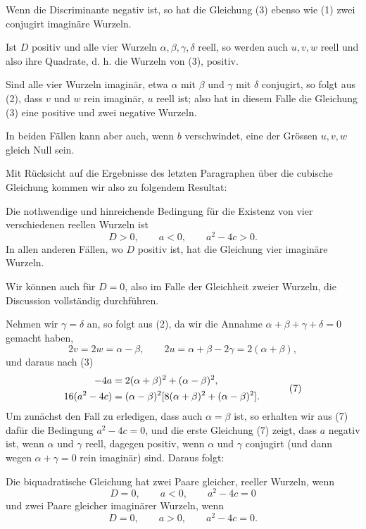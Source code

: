 \documentclass[11pt]{article}
\begin{document}
Wenn die Discriminante negativ ist, so hat die Gleichung (3) ebenso wie (1) zwei conjugirt imagin\"are Wurzeln.

Ist $D$ positiv und alle vier Wurzeln $\alpha,\beta,\gamma,\delta$ reell, so werden auch $u,v,w$ reell und also ihre Quadrate, d. h. die Wurzeln von (3), positiv.

Sind alle vier Wurzeln imagin\"ar, etwa $\alpha$ mit $\beta$ und $\gamma$ mit $\delta$ conjugirt, so folgt aus (2), dass $v$ und $w$ rein imagin\"ar, $u$ reell ist; also hat in diesem Falle die Gleichung (3) eine positive und zwei negative Wurzeln.

In beiden F\"allen kann aber auch, wenn $b$ verschwindet, eine der Gr\"ossen $u,v,w$ gleich Null sein.

Mit R\"ucksicht auf die Ergebnisse des letzten Paragraphen \"uber die cubische Gleichung kommen wir also zu folgendem Resultat:

Die nothwendige und hinreichende Bedingung f\"ur die Existenz von vier verschiedenen reellen Wurzeln ist
\begin{equation}
        D>0,
        \qquad a<0,
        \qquad a^2-4c>0.
\tag{6}
\end{equation}
In allen anderen F\"allen, wo $D$ positiv ist, hat die Gleichung vier imagin\"are Wurzeln.

Wir k\"onnen auch f\"ur $D=0$, also im Falle der Gleichheit zweier Wurzeln, die Discussion vollst\"andig durchf\"uhren.

Nehmen wir $\gamma=\delta$ an, so folgt aus (2), da wir die Annahme $\alpha+\beta+\gamma+\delta=0$ gemacht haben,
\[
        2v=2w=\alpha-\beta,
        \qquad
        2u=\alpha+\beta-2\gamma=2(\alpha+\beta),
\]
und daraus nach (3)
\begin{equation}
\begin{aligned}
        -4a&=2(\alpha+\beta)^2+(\alpha-\beta)^2,\cr
        16(a^2-4c)&=(\alpha-\beta)^2[8(\alpha+\beta)^2+(\alpha-\beta)^2].
\end{aligned}
\tag{7}
\end{equation}
Um zun\"achst den Fall zu erledigen, dass auch $\alpha=\beta$ ist, so erhalten wir aus (7) daf\"ur die Bedingung $a^2-4c=0$, und die erste Gleichung (7) zeigt, dass $a$ negativ ist, wenn $\alpha$ und $\gamma$ reell, dagegen positiv, wenn $\alpha$ und $\gamma$ conjugirt (und dann wegen $\alpha+\gamma=0$ rein imagin\"ar) sind. Daraus folgt:

Die biquadratische Gleichung hat zwei Paare gleicher, reeller Wurzeln, wenn
\begin{equation}
        D=0,
        \qquad a<0,
        \qquad a^2-4c=0
\tag{8}
\end{equation}
und zwei Paare gleicher imagin\"arer Wurzeln, wenn
\begin{equation}
        D=0,
        \qquad a>0,
        \qquad a^2-4c=0.
\tag{9}
\end{equation}
\end{document}
